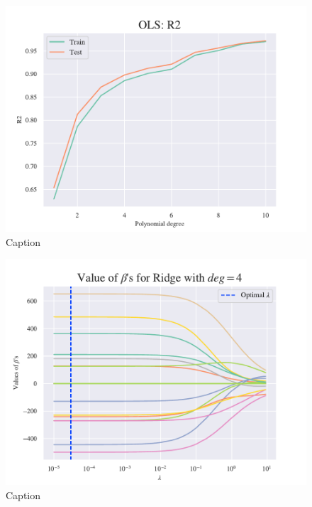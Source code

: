 \begin{figure}
    \centering
    \includegraphics[width=1\linewidth]{project_1/figures/figures_in_appendix/OLS_R2_terrain.pdf}
    \caption{Caption}
    \label{fig:ref}
\end{figure}

\begin{figure}
    \centering
    \includegraphics[width=1\linewidth]{project_1/figures/figures_in_appendix/Ridge_Betas_lambda_terrain_const_deg.pdf}
    \caption{Caption}
    \label{fig:ref}
\end{figure}

